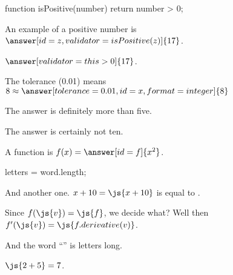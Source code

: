 \documentclass{ximera}
\begin{document}
\begin{javascript}
  function isPositive(number) {
    return number > 0;
  }
\end{javascript}

\begin{problem}
  An example of a positive number is $\answer[id=z,validator=isPositive(z)]{17}$.

  $\answer[validator=this>0]{17}$.


  The tolerance (0.01) means $8 \approx \answer[tolerance=0.01,id=x,format=integer]{8}$
  
  \begin{feedback}
    The answer is definitely more than five.
  \end{feedback}

  \begin{feedback}[x==10]
    The answer is certainly not ten.
  \end{feedback}

  A function is $f(x) = \answer[id=f]{x^2}$.
\end{problem}

\begin{javascript}
  letters = word.length;
\end{javascript}

And another one.  $x + 10 = \js{x+10}$ is equal to .

Since $f(\js{v}) = \js{f}$, we decide what?  Well then $f'(\js{v}) = \js{f.derivative(v)}$.

And the word ``'' is  letters long.

$\js{2+5} = 7$.
\end{document}
